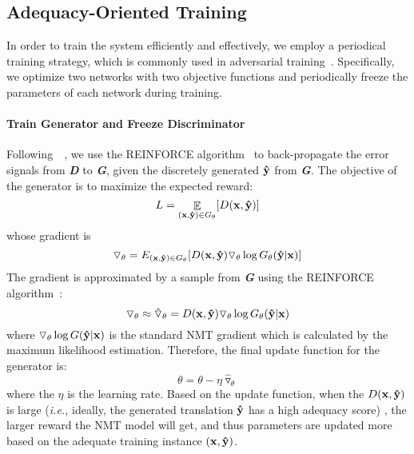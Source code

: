 \documentclass[letterpaper]{article} \usepackage{aaai19}  \usepackage{times}  \usepackage{helvet}  \usepackage{courier}  \usepackage{url}  \usepackage{graphicx}  \frenchspacing  \setlength{\pdfpagewidth}{8.5in}  \setlength{\pdfpageheight}{11in}  \usepackage{amsmath}
\DeclareMathOperator{\E}{\mathbb{E}}
\begin{document}
\subsection{Adequacy-Oriented Training}

In order to train the system efficiently and effectively, we employ a periodical training strategy, which is commonly used in adversarial training~\cite{goodfellow2014generative,wu2017adversarial}. Specifically, we optimize two networks with two objective functions and periodically freeze the parameters of each network during training.


\paragraph{Train Generator and Freeze Discriminator}
Following~\citeauthor{wu2017adversarial}~, we use the REINFORCE algorithm~\cite{williams1992simple} to back-propagate the error signals from {\bf \em D} to {\bf \em G}, given the discretely generated ${\bf \hat{y}}$ from {\bf \em G}. The objective of the generator is to maximize the expected reward:
\begin{equation}
L  = \E_{({\bf x}, {\bf \hat{y}}) \in G_{\theta}}[D({\bf x}, {\bf \hat{y}})] \end{equation}
whose gradient is
 \begin{equation}
   {\triangledown_{\theta}}
= {E_{({\bf x}, {\bf \hat{y}}) \in G_{\theta}}}[D({\bf x},{\bf \hat{y}}) {\triangledown_{{\theta}}}\log G_{\theta}({\bf \hat{y}}|{\bf x})] \end{equation}
The gradient is approximated by a sample from {\bf \em G} using the REINFORCE algorithm~\cite{williams1992simple}:
\begin{equation}
   {\triangledown_{\theta}} \approx {\hat{\triangledown}_{\theta}} = D({\bf x},{\bf \hat{y}}){\triangledown_{{\theta}}} \log G_{\theta}({\bf \hat{y}}|{\bf x}) \label{eqn-gradient}
\end{equation}
where ${\triangledown_{{\theta}}} \log G({\bf \hat{y}}|{\bf x})$ is the standard NMT gradient which is calculated by the maximum likelihood estimation.
Therefore, the final update function for the generator is:
\begin{equation}
   {\theta}={\theta}- \eta {\hat{\triangledown}_{\theta}} \end{equation}
where the $\eta$ is the learning rate.
Based on the update function, when the $D({\bf x},{\bf \hat{y}})$ is large (\emph{i.e.,}\xspace ideally, the generated translation ${\bf \hat{y}}$ has a high adequacy score) , the larger reward the NMT model will get, and thus parameters are updated more based on the adequate training instance $({\bf x},{\bf \hat{y}})$.
\end{document}
